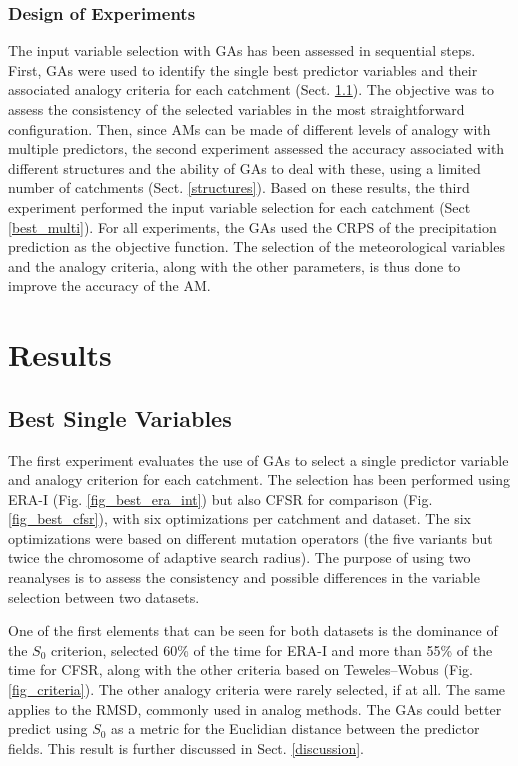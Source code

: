 \documentclass[draft]{agujournal2019}
\begin{document}
\subsubsection{Design of Experiments}
\label{experiments}

The input variable selection with GAs has been assessed in sequential steps. First, GAs were used to identify the single best predictor variables and their associated analogy criteria for each catchment (Sect. \ref{best_single}). The objective was to assess the consistency of the selected variables in the most straightforward configuration. Then, since AMs can be made of different levels of analogy with multiple predictors, the second experiment assessed the accuracy associated with different structures and the ability of GAs to deal with these, using a limited number of catchments (Sect. \ref{structures}). Based on these results, the third experiment performed the input variable selection for each catchment (Sect \ref{best_multi}). For all experiments, the GAs used the CRPS of the precipitation prediction as the objective function. The selection of the meteorological variables and the analogy criteria, along with the other parameters, is thus done to improve the accuracy of the AM.


\section{Results}
\label{results}

\subsection{Best Single Variables}
\label{best_single}

The first experiment evaluates the use of GAs to select a single predictor variable and analogy criterion for each catchment. The selection has been performed using ERA-I (Fig. \ref{fig_best_era_int}) but also CFSR for comparison (Fig. \ref{fig_best_cfsr}), with six optimizations per catchment and dataset. The six optimizations were based on different mutation operators (the five variants but twice the chromosome of adaptive search radius). The purpose of using two reanalyses is to assess the consistency and possible differences in the variable selection between two datasets.

One of the first elements that can be seen for both datasets is the dominance of the $S_{0}$ criterion, selected 60\% of the time for ERA-I and more than 55\% of the time for CFSR, along with the other criteria based on Teweles--Wobus (Fig. \ref{fig_criteria}). The other analogy criteria were rarely selected, if at all. The same applies to the RMSD, commonly used in analog methods. The GAs could better predict using $S_{0}$ as a metric for the Euclidian distance between the predictor fields. This result is further discussed in Sect. \ref{discussion}.
\end{document}
